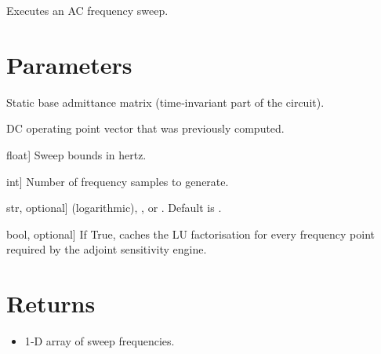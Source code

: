 \documentclass[letterpaper,10pt,english]{sphinxmanual}
\begin{document}
\begin{fulllineitems}

\pysigstartsignatures
\pysigline
{}
\pysigline
{}
\pysigstopsignatures
\sphinxAtStartPar
Executes an AC frequency sweep.


\section{Parameters}
\label{\detokenize{ac_engine:id1}}\begin{description}
\sphinxlineitem{Y\_base\_lil}{[}\sphinxcode{\sphinxupquote{scipy.sparse.lil\_matrix}}{]}
\sphinxAtStartPar
Static base admittance matrix (time‑invariant part of the circuit).

\sphinxlineitem{VI\_dc}{[}\sphinxcode{\sphinxupquote{numpy.ndarray}}{]}
\sphinxAtStartPar
DC operating point vector that was previously computed.

\sphinxlineitem{start\_freq, stop\_freq}{[}float{]}
\sphinxAtStartPar
Sweep bounds in hertz.

\sphinxlineitem{points}{[}int{]}
\sphinxAtStartPar
Number of frequency samples to generate.

\sphinxlineitem{sweep\_type}{[}str, optional{]}
\sphinxAtStartPar
{} (logarithmic), ,  or .  Default is .

\sphinxlineitem{keep\_lus}{[}bool, optional{]}
\sphinxAtStartPar
If True, caches the LU factorisation for every frequency point \textendash{} required by
the adjoint sensitivity engine.

\end{description}


\section{Returns}
\label{\detokenize{ac_engine:id2}}\begin{description}
\sphinxAtStartPar
{}
\begin{itemize}
\item {} 
\sphinxAtStartPar
{} \textendash{} 1‑D array of sweep frequencies.


\end{itemize}
\end{description}
\end{fulllineitems}
\end{document}
